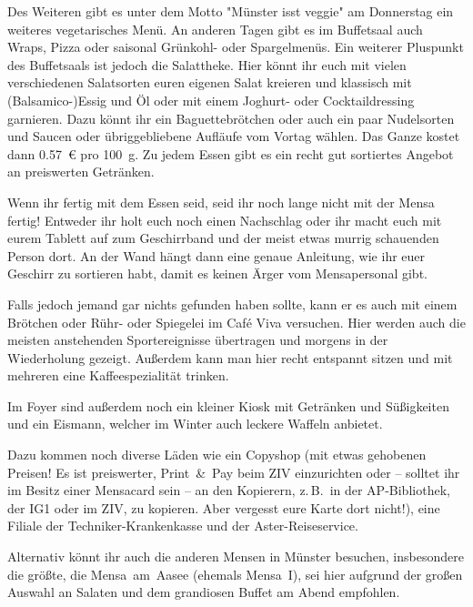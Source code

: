 \begin{multicols*}{2}
Des Weiteren gibt es unter dem Motto "Münster isst veggie" am Donnerstag ein weiteres vegetarisches Menü.
An anderen Tagen gibt es im Buffetsaal auch Wraps, Pizza oder saisonal Grünkohl- oder Spargelmenüs.
Ein weiterer Pluspunkt des Buffetsaals ist jedoch die Salattheke.
Hier könnt ihr euch mit vielen verschiedenen Salatsorten euren eigenen Salat kreieren und klassisch mit (Balsamico-)Essig und Öl oder mit einem Joghurt- oder Cocktaildressing garnieren.
Dazu könnt ihr ein Baguettebrötchen oder auch ein paar Nudelsorten und Saucen oder übriggebliebene Aufläufe vom Vortag wählen.
Das Ganze kostet dann \SI{0,57}{\euro} pro \SI{100}{\g}.
Zu jedem Essen gibt es ein recht gut sortiertes Angebot an preiswerten Getränken.

Wenn ihr fertig mit dem Essen seid, seid ihr noch lange nicht mit der Mensa fertig!
Entweder ihr holt euch noch einen Nachschlag oder ihr macht euch mit eurem Tablett auf zum Geschirrband und der meist etwas murrig schauenden Person dort.
An der Wand hängt dann eine genaue Anleitung, wie ihr euer Geschirr zu sortieren habt, damit es keinen Ärger vom Mensapersonal gibt.


Falls jedoch jemand gar nichts gefunden haben sollte, kann er es auch mit einem Brötchen oder Rühr- oder Spiegelei im Café Viva versuchen.
Hier werden auch die meisten anstehenden Sportereignisse übertragen und morgens in der Wiederholung gezeigt.
Außerdem kann man hier recht entspannt sitzen und mit mehreren eine Kaffeespezialität trinken.

Im Foyer sind außerdem noch ein kleiner Kiosk mit Getränken und Süßigkeiten und ein Eismann, welcher im Winter auch leckere Waffeln anbietet.

Dazu kommen noch diverse Läden wie ein Copyshop (mit etwas gehobenen Preisen!
Es ist preiswerter, Print~\&~Pay beim ZIV einzurichten oder -- solltet ihr im Besitz einer Mensacard sein -- an den Kopierern, z.\,B.\ in der AP-Bibliothek, der IG1 oder im ZIV, zu kopieren.
Aber vergesst eure Karte dort nicht!), eine Filiale der Techniker-Krankenkasse und der Aster-Reiseservice.

Alternativ könnt ihr auch die anderen Mensen in Münster besuchen, insbesondere die größte, die Mensa~am~Aasee (ehemals Mensa~I), sei hier aufgrund der großen Auswahl an Salaten und dem grandiosen Buffet am Abend empfohlen.

\end{multicols*}
